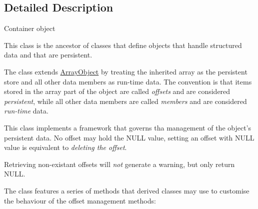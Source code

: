 \subsection{Detailed Description}
Container object

This class is the ancestor of classes that define objects that handle structured data and that are persistent.

The class extends {\ttfamily \hyperlink{}{Array\-Object}} by treating the inherited array as the persistent store and all other data members as run-\/time data. The convention is that items stored in the array part of the object are called {\itshape offsets} and are considered {\itshape persistent}, while all other data members are called {\itshape members} and are considered {\itshape run-\/time} data.

This class implements a framework that governs tha management of the object's persistent data. No offset may hold the {\ttfamily N\-U\-L\-L} value, setting an offset with {\ttfamily N\-U\-L\-L} value is equivalent to {\itshape deleting the offset}.

Retrieving non-\/existant offsets will {\itshape not} generate a warning, but only return {\ttfamily N\-U\-L\-L}.

The class features a series of methods that derived classes may use to customise the behaviour of the offset management methods\-:


